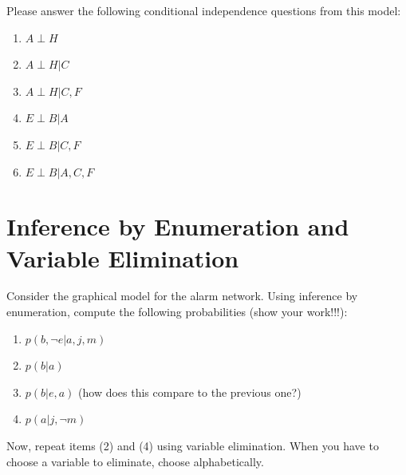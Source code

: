 \documentclass[fleqn]{hw}
\newcommand{\indep}{\perp}
\begin{document}
Please answer the following conditional independence questions from
this model:

\begin{enumerate}
\item $A \indep H$
\item $A \indep H | C$
\item $A \indep H | C,F$
\item $E \indep B | A$
\item $E \indep B | C,F$
\item $E \indep B | A,C,F$
\end{enumerate}

\newpage
\section{Inference by Enumeration and Variable Elimination}

Consider the graphical model for the alarm network.  Using inference by enumeration, compute the
following probabilities (show your work!!!):

\begin{enumerate}
\item $p(b, \lnot e | a, j, m)$
\item $p(b | a)$
\item $p(b | e,a)$  (how does this compare to the previous one?)
\item $p(a | j,\lnot m)$
\end{enumerate}

Now, repeat items (2) and (4) using variable elimination.  When you
have to choose a variable to eliminate, choose alphabetically.
\end{document}
